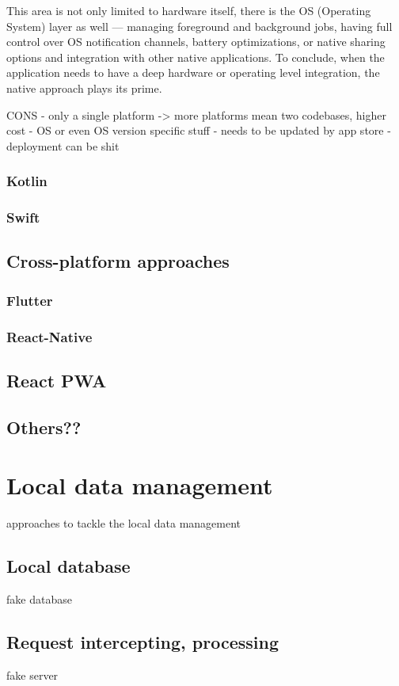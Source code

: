 \documentclass[
  digital,     %
  color,       %
  oneside,     %
  nosansbold,  %
  nocolorbold, %
  lof,         %
  lot,         %
]{fithesis4}
\begin{document}
This area is not only limited to hardware itself, there is the OS (Operating System) layer as well --- managing foreground and background jobs, having full control over OS notification channels, battery optimizations, or native sharing options and integration with other native applications. To conclude, when the application needs to have a deep hardware or operating level integration, the native approach plays its prime.

CONS
- only a single platform -> more platforms mean two codebases, higher cost
- OS or even OS version specific stuff
- needs to be updated by app store
- deployment can be shit

\subsubsection{Kotlin}
\subsubsection{Swift}
\subsection{Cross-platform approaches}
\subsubsection{Flutter}
\subsubsection{React-Native}
\subsection{React PWA}
\subsection{Others??}
\section{Local data management}
approaches to tackle the local data management
\subsection{Local database}
fake database
\subsection{Request intercepting, processing}
fake server
\end{document}
